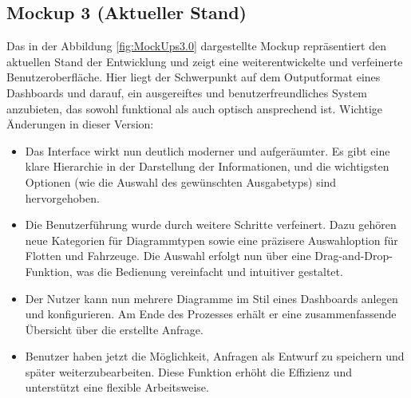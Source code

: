 \subsection*{Mockup 3 (Aktueller Stand)}
Das in der Abbildung \ref{fig:MockUps3.0} dargestellte Mockup repräsentiert den aktuellen Stand der Entwicklung und zeigt eine weiterentwickelte und verfeinerte Benutzeroberfläche. Hier liegt der Schwerpunkt auf dem Outputformat eines Dashboards und darauf, ein ausgereiftes und benutzerfreundliches System anzubieten, das sowohl funktional als auch optisch ansprechend ist.
\newline
Wichtige Änderungen in dieser Version:
\begin{itemize}
    \item Das Interface wirkt nun deutlich moderner und aufgeräumter. Es gibt eine klare Hierarchie in der Darstellung der Informationen, und die wichtigsten Optionen (wie die Auswahl des gewünschten Ausgabetyps) sind hervorgehoben.
    \item Die Benutzerführung wurde durch weitere Schritte verfeinert. Dazu gehören neue Kategorien für Diagrammtypen sowie eine präzisere Auswahloption für Flotten und Fahrzeuge. Die Auswahl erfolgt nun über eine Drag-and-Drop-Funktion, was die Bedienung vereinfacht und intuitiver gestaltet.
    \item Der Nutzer kann nun mehrere Diagramme im Stil eines Dashboards anlegen und konfigurieren. Am Ende des Prozesses erhält er eine zusammenfassende Übersicht über die erstellte Anfrage.
    \item Benutzer haben jetzt die Möglichkeit, Anfragen als Entwurf zu speichern und später weiterzubearbeiten. Diese Funktion erhöht die Effizienz und unterstützt eine flexible Arbeitsweise. 
\end{itemize}
